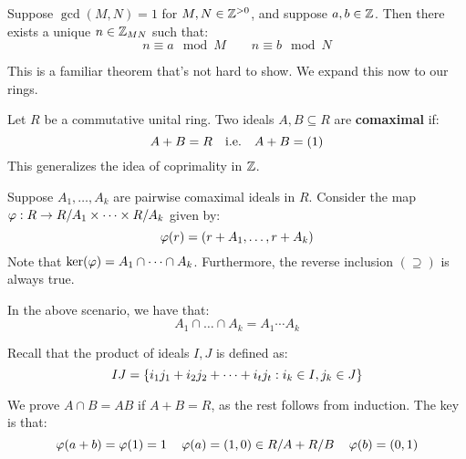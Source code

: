 \begin{lm}
    Suppose $ \gcd(M, N) = 1 $ for $ M, N \in \mathbb{Z}^{>0} $, and suppose $ a, b \in \mathbb{Z} $.
    Then there exists a unique $ n \in \mathbb{Z}_{MN} $ such that:
    \begin{equation*}
        n \equiv a \mod M \qquad n \equiv b \mod N
    \end{equation*}
\end{lm}

This is a familiar theorem that's not hard to show. We expand this now to our rings.

\begin{defn}
    Let $ R $ be a commutative unital ring.
    Two ideals $ A, B \subseteq R $ are \textbf{comaximal} if:
    \begin{equation*}
        A + B = R \quad \textrm{i.e.} \quad A + B = (1)
    \end{equation*}
    This generalizes the idea of coprimality in $ \mathbb{Z} $.
\end{defn}

Suppose $ A_{1}, \dots, A_{k} $ are pairwise comaximal ideals in $ R $.
Consider the map $ \operatorname{\varphi} : R \rightarrow R/A_{1} \times \dots \times R/A_{k} $ given by:
\begin{equation*}
    \operatorname{\varphi}(r) = (r + A_{1}, \dots, r + A_{k})
\end{equation*}
Note that $ \ker(\operatorname{\varphi}) = A_{1} \cap \dots \cap A_{k} $.
Furthermore, the reverse inclusion $ (\supseteq) $ is always true.
\begin{thm}[title=Chinese Remainder Theorem(?)]
    In the above scenario, we have that:
    \begin{equation*}
        A_{1} \cap \dots \cap A_{k} = A_{1}\cdots A_{k}
    \end{equation*}
\end{thm}

Recall that the product of ideals $ I, J $ is defined as:
\begin{equation*}
    IJ = \left\{{i_{1}j_{1} + i_{2}j_{2} + \dots + i_{t}j_{t} : i_{k} \in I, j_{k} \in J}\right\}
\end{equation*}

\begin{pf}[source=Primary Source Material]
    We prove $ A \cap B = AB $ if $ A + B = R $, as the rest follows from induction. \vsp
    The key is that:
    \begin{equation*}
        \operatorname{\varphi}(a + b) = \operatorname{\varphi}(1) = 1 \quad \operatorname{\varphi}(a) = (1, 0) \in R/A + R/B \quad \operatorname{\varphi}(b) = (0, 1)
    \end{equation*}
\end{pf} \

